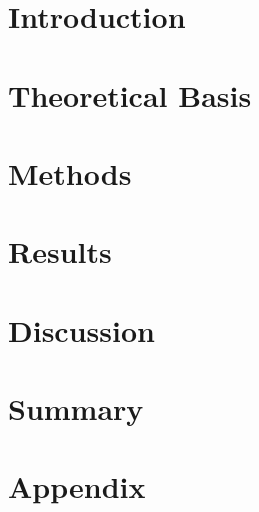 \documentclass[%
 reprint,
runinaddress,
 amsmath,amssymb,
 aps,
]{revtex4-2}
\begin{document}


\maketitle




\section{Introduction \label{sec:intro}}


\section{Theoretical Basis \label{sec:theory}}


\section{Methods \label{sec:methods}}


\section{Results \label{sec:results}}


\section{Discussion \label{sec:discussion}}


\section{Summary \label{sec:summary}}




\section*{Appendix \label{sec:appendix}}
\clearpage

\end{document}
